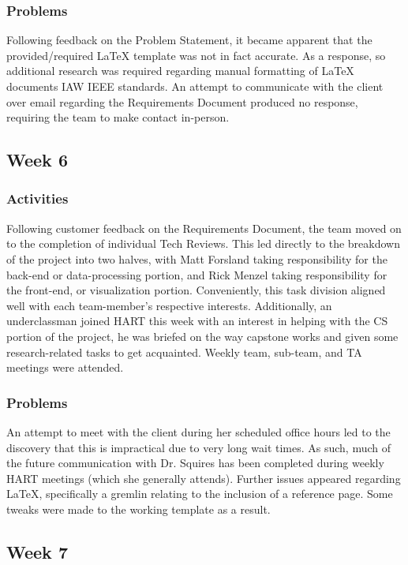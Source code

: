 \documentclass[journal,10pt,onecolumn,compsoc]{IEEEtran}
\begin{document}
		\subsubsection{Problems}
			Following feedback on the Problem Statement, it became apparent that the provided/required LaTeX template was not in fact accurate.
			As a response, so additional research was required regarding manual formatting of LaTeX documents IAW IEEE standards.
			An attempt to communicate with the client over email regarding the Requirements Document produced no response, requiring the team to make contact in-person.
		
	\subsection{Week 6}
	
		\subsubsection{Activities}
			Following customer feedback on the Requirements Document, the team moved on to the completion of individual Tech Reviews.
			This led directly to the breakdown of the project into two halves, with Matt Forsland taking responsibility for the back-end or data-processing portion, and Rick Menzel taking responsibility for the front-end, or visualization portion.
			Conveniently, this task division aligned well with each team-member's respective interests.
			Additionally, an underclassman joined HART this week with an interest in helping with the CS portion of the project, he was briefed on the way capstone works and given some research-related tasks to get acquainted.
			Weekly team, sub-team, and TA meetings were attended.			
				
		\subsubsection{Problems}
			An attempt to meet with the client during her scheduled office hours led to the discovery that this is impractical due to very long wait times. 
			As such, much of the future communication with Dr. Squires has been completed during weekly HART meetings (which she generally attends).
			Further issues appeared regarding LaTeX, specifically a gremlin relating to the inclusion of a reference page.
			Some tweaks were made to the working template as a result.
	
	\subsection{Week 7}
	
\end{document}
